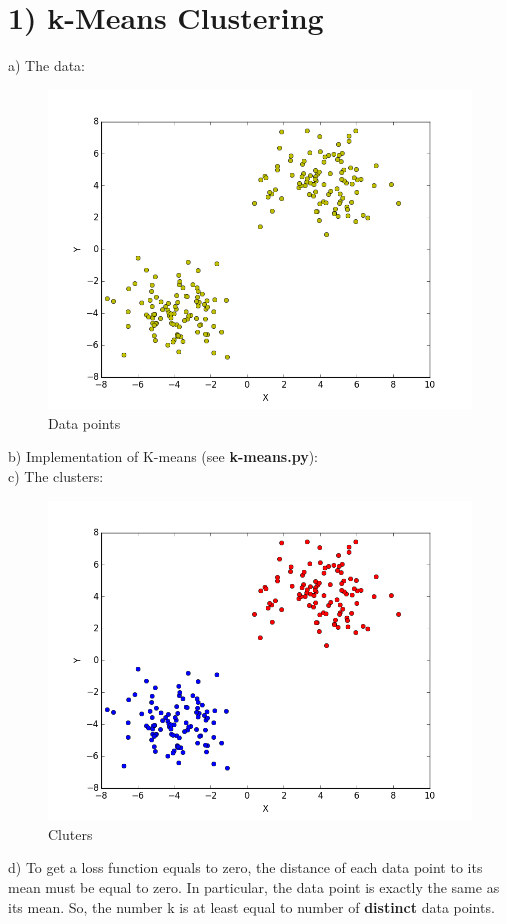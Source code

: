 \documentclass{article}
\begin{document}
\section*{1) k-Means Clustering}
a) The data:
\begin{figure}[H]
	\centering
	\includegraphics[scale=0.5]{data.png}
	\caption{Data points}
	\label{fig1}	
\end{figure}
b) Implementation of K-means (see \textbf{k-means.py}):\\
c) The clusters:
\begin{figure}[H]
	\centering
	\includegraphics[scale=0.5]{clustered.png}
	\caption{Cluters}
	\label{fig1}	
\end{figure}
d) To get a loss function equals to zero, the distance of each data point to its mean must be equal to zero. In particular, the data point is exactly the same as its mean. So, the number k is at least equal to number of \textbf{distinct} data points.
\end{document}
